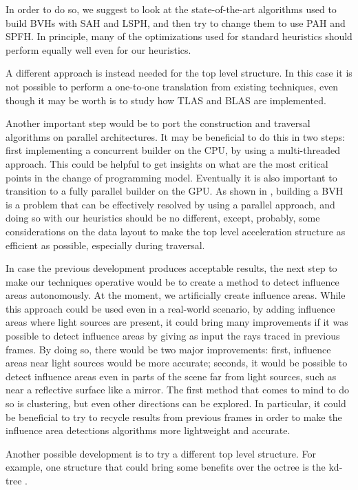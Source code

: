 \documentclass{PoliMi_MasterThesis}
\begin{document}
In order to do so, we suggest to look at the state-of-the-art algorithms used to build BVHs with SAH and LSPH, and then try to change them to use PAH and SPFH. In principle, many of the optimizations used for standard heuristics should perform equally well even for our heuristics.

A different approach is instead needed for the top level structure. In this case it is not possible to perform a one-to-one translation from existing techniques, even though it may be worth is to study how TLAS and BLAS \cite{tlas_blas} are implemented.

Another important step would be to port the construction and traversal algorithms on parallel architectures. It may be beneficial to do this in two steps: first implementing a concurrent builder on the CPU, by using a multi-threaded approach. This could be helpful to get insights on what are the most critical points in the change of programming model. Eventually it is also important to transition to a fully parallel builder on the GPU. As shown in \cite{parallel_bvhs}, building a BVH is a problem that can be effectively resolved by using a parallel approach, and doing so with our heuristics should be no different, except, probably, some considerations on the data layout to make the top level acceleration structure as efficient as possible, especially during traversal.

In case the previous development produces acceptable results, the next step to make our techniques operative would be to create a method to detect influence areas autonomously. At the moment, we artificially create influence areas. While this approach could be used even in a real-world scenario, by adding influence areas where light sources are present, it could bring many improvements if it was possible to detect influence areas by giving as input the rays traced in previous frames. By doing so, there would be two major improvements: first, influence areas near light sources would be more accurate; seconds, it would be possible to detect influence areas even in parts of the scene far from light sources, such as near a reflective surface like a mirror. The first method that comes to mind to do so is clustering, but even other directions can be explored. In particular, it could be beneficial to try to recycle results from previous frames in order to make the influence area detections algorithms more lightweight and accurate.

Another possible development is to try a different top level structure. For example, one structure that could bring some benefits over the octree is the kd-tree \cite{kd_trees}.
\end{document}

